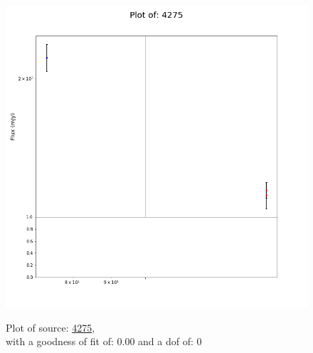 \documentclass{article}
\begin{document}
\begin{figure}[H]
    \centering
    \begin{minipage}{.5\textwidth}
        \centering
        \includegraphics[scale = 0.35]{KmeulenSimSource_1hr/1hr4275.png}
        \captionsetup{labelformat=empty}
        \caption{Plot of source: \href{http://banana.transientskp.org/r4/vlo_KmeulenSimSource/runningcatalog/4275}{4275},\\with a goodness of fit of: 0.00 and a dof of: 0}
        \addtocounter{figure}{-1}
        \label{KmeulenSimSource:1hr:4275:plot}
    \end{minipage}%
    \begin{minipage}{0.5\textwidth}
        \centering


\end{minipage}
\end{figure}
\end{document}
